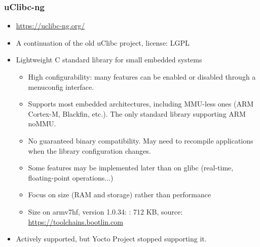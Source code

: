 \begin{frame}
  \frametitle{uClibc-ng}
  \begin{itemize}
  \item \url{https://uclibc-ng.org/}
  \item A continuation of the old uClibc project, license: LGPL
  \item Lightweight C standard library for small embedded systems
    \begin{itemize}
    \item High configurability: many features can be enabled or
      disabled through a menuconfig interface.
    \item Supports most embedded architectures, including MMU-less
          ones (ARM Cortex-M, Blackfin, etc.). The only standard library
          supporting ARM noMMU.
    \item No guaranteed binary compatibility. May need to
      recompile applications when the library configuration changes.
    \item Some features may be implemented later than on glibc (real-time,
          floating-point operations...)
    \item Focus on size (RAM and storage) rather than performance
    \item Size on armv7hf, version 1.0.34:
      : 712 KB, source: \url{https://toolchains.bootlin.com}
    \end{itemize}
    \item Actively supported, but Yocto Project stopped supporting it.
  \end{itemize}
\end{frame}

